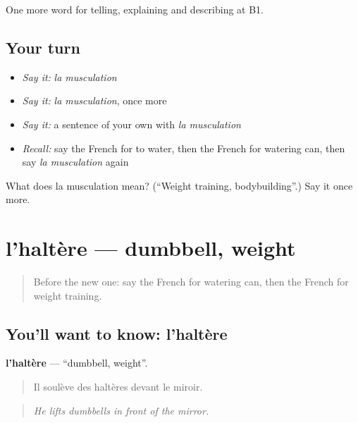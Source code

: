 \begin{grammarlens}[title={What you've built}]
One more word for telling, explaining and describing at B1.
\end{grammarlens}

\subsection*{Your turn}
\begin{itemize}
\raggedright
  \item \emph{Say it:} \emph{la musculation}
  \item \emph{Say it:} \emph{la musculation}, once more
  \item \emph{Say it:} a sentence of your own with \emph{la musculation}
  \item \emph{Recall:} say the French for to water, then the French for watering can, then say \emph{la musculation} again
\end{itemize}

\begin{tcolorbox}[breakable,colback=teal!4,colframe=teal!35!black,title={Before you move on}]
What does la musculation mean? (\textquotedblleft{}Weight training, bodybuilding\textquotedblright{}.) Say it once more.
\end{tcolorbox}
\section[l'haltère]{l'haltère — dumbbell, weight}

\label{lesson:FR-C504-haltere}



\begin{quote}
Before the new one: say the French for watering can, then the French for weight training.
\end{quote}

\subsection*{You'll want to know: l'haltère}
\textbf{l'haltère} — \textquotedblleft{}dumbbell, weight\textquotedblright{}.

\begin{quote}
Il soulève des haltères devant le miroir.
\end{quote}

\begin{quote}
\emph{He lifts dumbbells in front of the mirror.}
\end{quote}

